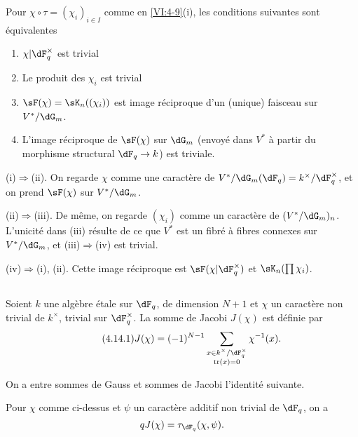 \begin{lemma_}\label{VI:4-13}
Pour $\chi\circ \tau=(\chi_i)_{i\in I}$ comme en \ref{VI:4-9}(i), les
conditions suivantes sont équivalentes 
\begin{enumerate}[\indent (i)]
  \item $\chi| \dF_q^\times$ est trivial 
  \item Le produit des $\chi_i$ est trivial 
  \item $\sF(\chi) = \sK_n((\chi_i))$ est image réciproque d'un (unique) 
    faisceau sur $V^\ast/\dG_m$. 
  \item L'image réciproque de $\sF(\chi)$ sur $\dG_m$ (envoyé dans 
    $V^\ast$ à partir du morphisme structural $\dF_q \to k$) est triviale. 
\end{enumerate}
\end{lemma_}

(i)$\Rightarrow$(ii). On regarde $\chi$ comme une caractère de 
$V^\ast/\dG_m(\dF_q)=k^\times/\dF_q^\times$, et on prend $\sF(\chi)$ sur 
$V^\ast/\dG_m$. 

(ii)$\Rightarrow$(iii). De même, on regarde $(\chi_i)$ comme un caractère 
de $(V^\ast/\dG_m)_n$. L'unicité dans (iii) résulte de ce que $V^\ast$ est 
un fibré à fibres connexes sur $V^\ast/\dG_m$, et (iii)$\Rightarrow$(iv)  
est trivial. 

(iv)$\Rightarrow$(i), (ii). Cette image réciproque est 
$\sF(\chi|\dF_q^\times)$ et $\sK_n(\prod \chi_i)$. 





\subsection{}\label{VI:4-14}

Soient $k$ une algèbre étale sur $\dF_q$, de 
dimension $N+1$ et $\chi$ un caractère non trivial de $k^\times$, trivial sur 
$\dF_q^\times$. La somme de Jacobi $J(\chi)$ est définie par 
\begin{equation*}\tag{4.14.1}\label{VI:eq:4-14-1}
  J(\chi) = (-1)^{N-1} \sum_{\substack{x\in k^\times/\dF_q^\times \\ \tr(x)=0}} \chi^{-1}(x) \text{.} 
\end{equation*}

On a entre sommes de Gauss et sommes de Jacobi l'identité suivante. 





\begin{proposition_}\label{VI:4-15}
Pour $\chi$ comme ci-dessus et $\psi$ un caractère additif non trivial de 
$\dF_q$, on a 
\[
  q J(\chi) = \tau_{\dF_q}(\chi,\psi) \text{.} 
\]
\end{proposition_}

